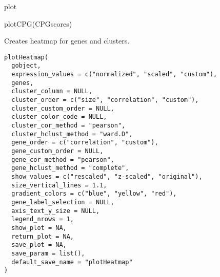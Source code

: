 \documentclass[a4paper]{book}
\begin{document}
%
\begin{Value}
plot
\end{Value}
%
\begin{Examples}
\begin{ExampleCode}
    plotCPG(CPGscores)
\end{ExampleCode}
\end{Examples}
%
\begin{Description}\relax
Creates heatmap for genes and clusters.
\end{Description}
%
\begin{Usage}
\begin{verbatim}
plotHeatmap(
  gobject,
  expression_values = c("normalized", "scaled", "custom"),
  genes,
  cluster_column = NULL,
  cluster_order = c("size", "correlation", "custom"),
  cluster_custom_order = NULL,
  cluster_color_code = NULL,
  cluster_cor_method = "pearson",
  cluster_hclust_method = "ward.D",
  gene_order = c("correlation", "custom"),
  gene_custom_order = NULL,
  gene_cor_method = "pearson",
  gene_hclust_method = "complete",
  show_values = c("rescaled", "z-scaled", "original"),
  size_vertical_lines = 1.1,
  gradient_colors = c("blue", "yellow", "red"),
  gene_label_selection = NULL,
  axis_text_y_size = NULL,
  legend_nrows = 1,
  show_plot = NA,
  return_plot = NA,
  save_plot = NA,
  save_param = list(),
  default_save_name = "plotHeatmap"
)
\end{verbatim}
\end{Usage}
%
\end{document}
